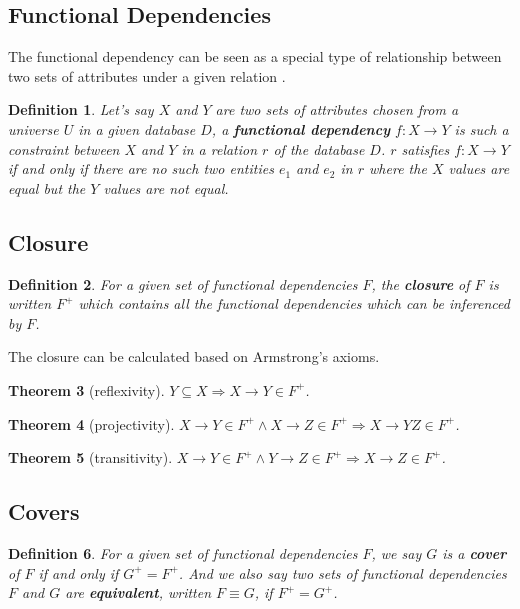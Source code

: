 \documentclass[11pt]{book}
\newtheorem{thm}{Theorem}[section]
\newtheorem{mydef}[thm]{Definition}
\begin{document}
\subsection{Functional Dependencies}

The functional dependency can be seen as a special type of relationship between two sets of attributes under a given relation \cite{beeri1979computational}.

\begin{mydef}
Let's say $X$ and $Y$ are two sets of attributes chosen from a universe $U$ in a given database $D$, a \textbf{functional dependency} $f: X \rightarrow Y$ is such a constraint between $X$ and $Y$ in a relation $r$ of the database $D$. $r$ satisfies $f: X \rightarrow Y$ if and only if there are no such two entities $e_1$ and $e_2$ in $r$ where the $X$ values are equal but the $Y$ values are not equal.
\end{mydef}

\subsection{Closure}

\begin{mydef}
For a given set of functional dependencies $F$, the \textbf{closure} of $F$ is written $F^+$ which contains all the functional dependencies which can be inferenced by $F$. 
\end{mydef}

The closure can be calculated based on Armstrong's axioms.

\begin{thm}[reflexivity]
  $Y \subseteq X \Rightarrow X \to Y \in F^+$.
\end{thm}

\begin{thm}[projectivity]
  $X \rightarrow Y \in F^+ \land X \rightarrow Z \in F^+ \Rightarrow X \rightarrow YZ \in F^+$.
\end{thm}

\begin{thm}[transitivity]
  $X \rightarrow Y \in F^+ \land Y \rightarrow Z \in F^+ \Rightarrow X \rightarrow Z \in F^+$.
\end{thm}

\subsection{Covers}

\begin{mydef}
For a given set of functional dependencies $F$, we say $G$ is a \textbf{cover} of $F$ if and only if $G^+ = F^+$. And we also say two sets of functional dependencies $F$ and $G$ are \textbf{equivalent}, written $F \equiv G$, if $F^+ = G^+$.
\end{mydef}
\end{document}
